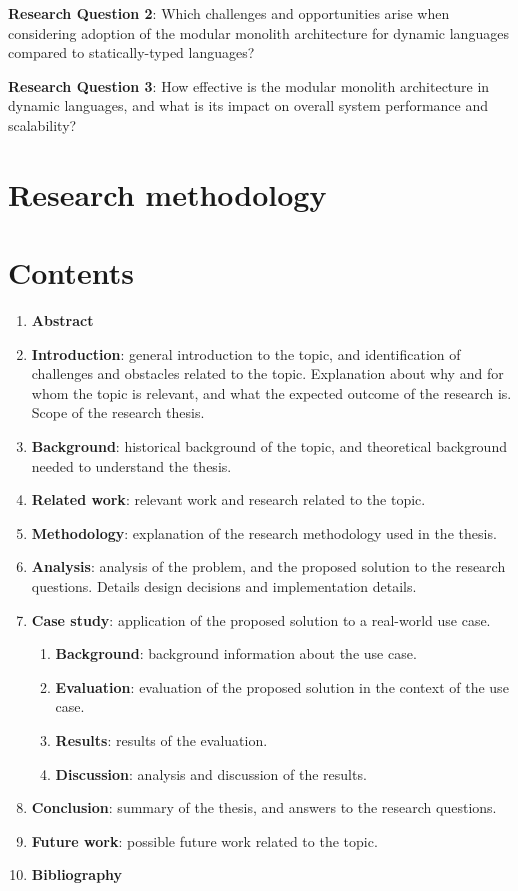 \documentclass[12pt]{article}
\begin{document}
	\textbf{Research Question 2}: Which challenges and opportunities arise when considering adoption of the modular monolith architecture for dynamic languages compared to statically-typed languages?

	\textbf{Research Question 3}: How effective is the modular monolith architecture in dynamic languages, and what is its impact on overall system performance and scalability?

	\clearpage

	\section{Research methodology}\label{sec:research-methodology}

	\clearpage

	\section{Contents}\label{sec:contents}

	\begin{enumerate}
		\item \textbf{Abstract}
		\item \textbf{Introduction}: general introduction to the topic, and identification of challenges and obstacles related to the topic.
		Explanation about why and for whom the topic is relevant, and what the expected outcome of the research is.
		Scope of the research thesis.
		\item \textbf{Background}: historical background of the topic, and theoretical background needed to understand the thesis.
		\item \textbf{Related work}: relevant work and research related to the topic.
		\item \textbf{Methodology}: explanation of the research methodology used in the thesis.
		\item \textbf{Analysis}: analysis of the problem, and the proposed solution to the research questions.
		Details design decisions and implementation details.
		\item \textbf{Case study}: application of the proposed solution to a real-world use case.
			\begin{enumerate}
				\item \textbf{Background}: background information about the use case.
				\item \textbf{Evaluation}: evaluation of the proposed solution in the context of the use case.
				\item \textbf{Results}: results of the evaluation.
				\item \textbf{Discussion}: analysis and discussion of the results.
			\end{enumerate}
		\item \textbf{Conclusion}: summary of the thesis, and answers to the research questions.
		\item \textbf{Future work}: possible future work related to the topic.
		\item \textbf{Bibliography}
	\end{enumerate}

	\clearpage


	\nocite{*}

	\printbibliography[heading=bibintoc]
\end{document}
